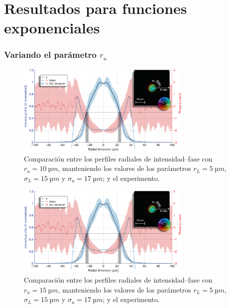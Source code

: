 \chapter{Resultados para funciones exponenciales}\label{anx:3}
\subsection*{Variando el parámetro $r_{u}$}

\begin{figure}[htbp]
  \centering
  \includegraphics[width=0.75\textwidth]{Figuras/anx_cmp_81.png}
  \caption*{Comparación entre los perfiles radiales de intensidad--fase con $r_{u}=\qty{10}{µm}$, manteniendo los valores de los parámetros $r_{L}=\qty{5}{µm}$, $\sigma_{L}=\qty{15}{µm}$ y $\sigma_{u}=\qty{17}{µm}$; y el experimento.}
\end{figure}

\begin{figure}[htbp]
  \centering
  \includegraphics[width=0.75\textwidth]{Figuras/anx_cmp_82.png}
  \caption*{Comparación entre los perfiles radiales de intensidad--fase con $r_{u}=\qty{15}{µm}$, manteniendo los valores de los parámetros $r_{L}=\qty{5}{µm}$, $\sigma_{L}=\qty{15}{µm}$ y $\sigma_{u}=\qty{17}{µm}$; y el experimento.}
\end{figure}

\newpage

